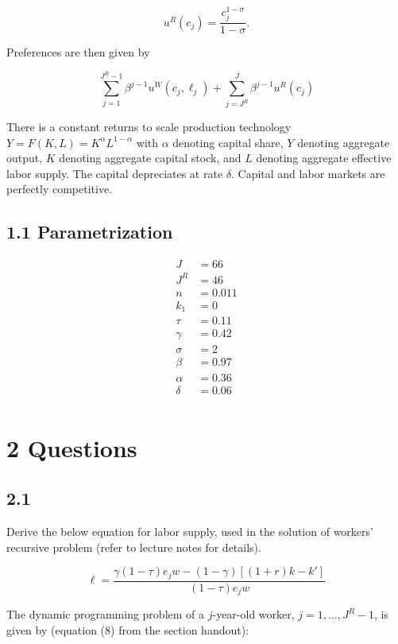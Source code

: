 \documentclass[]{article}
\begin{document}
\[u^R(c_j) = \frac{c_j^{1-\sigma}}{1-\sigma}.\]

\pagebreak

Preferences are then given by

\[\sum_{j=1}^{J^R-1}\beta^{j-1}u^W(c_j, \ell_j) + \sum_{j=J^R}^J \beta^{j-1}u^R(c_j)\]

There is a constant returns to scale production technology
\(Y=F(K, L)=K^\alpha L^{1-\alpha}\) with \(\alpha\) denoting capital
share, \(Y\) denoting aggregate output, \(K\) denoting aggregate capital
stock, and \(L\) denoting aggregate effective labor supply. The capital
depreciates at rate \(\delta\). Capital and labor markets are perfectly
competitive.

\subsection{1.1 Parametrization}\label{parametrization}

\begin{align*}
J &= 66 \\
J^R &= 46 \\
n &=  0.011  \\
k_1 &= 0 \\
\tau &= 0.11 \\
\gamma &= 0.42 \\
\sigma &= 2 \\
\beta &= 0.97  \\
\alpha &= 0.36 \\
\delta &= 0.06 \\
\end{align*}

\section{2 Questions}\label{questions}

\subsection{2.1}\label{section}

Derive the below equation for labor supply, used in the solution of
workers' recursive problem (refer to lecture notes for details).

\[
\ell = \frac{\gamma(1-\tau)e_jw-(1 - \gamma)[(1+r)k-k']}{(1-\tau)e_jw}
\]

The dynamic programming problem of a \(j\)-year-old worker,
\(j=1, ..., J^R-1\), is given by (equation (8) from the section
handout):
\end{document}
